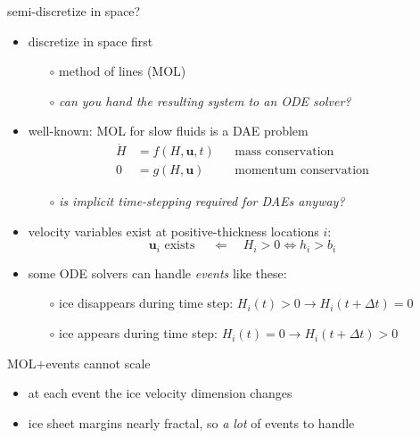 \documentclass[hide notes,intlimits,usenames,dvipsnames]{beamer}
\begin{document}
\begin{frame}{semi-discretize in space?}

\begin{itemize}
\item discretize in space first
    \begin{itemize}
    \item[$\circ$] method of lines (MOL)
    \item[$\circ$] \emph{can you hand the resulting system to an ODE solver?}
    \end{itemize}
\item well-known: MOL for slow fluids is a DAE problem
\begin{align*}
\dot H &= f(H,\mathbf{u},t) && \text{mass conservation} \\
     0 &= g(H,\mathbf{u})   && \text{momentum conservation}
\end{align*}
\vspace{-5mm}
    \begin{itemize}
    \item[$\circ$] \emph{is implicit time-stepping required for DAEs anyway?}
    \end{itemize}
\item velocity variables exist at positive-thickness locations $i$:
    $$\mathbf{u}_i \text{ exists } \quad \Longleftarrow \quad H_i > 0 \iff h_i > b_i$$
\item some ODE solvers can handle \emph{events} like these:
    \begin{itemize}
    \item[$\circ$] ice disappears during time step:  $H_i(t)>0 \to H_i(t+\Delta t)=0$
    \item[$\circ$] ice appears during time step:  $H_i(t)=0 \to H_i(t+\Delta t)>0$
    \end{itemize}
\end{itemize}
\end{frame}


\begin{frame}{MOL$+$events cannot scale}

\begin{center}

\end{center}

\vspace{-6mm}
\begin{itemize}
\item at each event the ice velocity dimension changes
\item ice sheet margins nearly fractal, so \emph{a lot} of events to handle
\end{itemize}
\end{frame}
\end{document}
